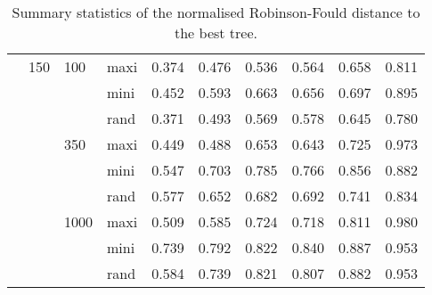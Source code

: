 \begin{table}[ht]
\begin{tabular}{llllrrrrrr}
   & 150 & 100 & maxi & 0.374 & 0.476 & 0.536 & 0.564 & 0.658 & 0.811 \\ 
   &  &  & mini & 0.452 & 0.593 & 0.663 & 0.656 & 0.697 & 0.895 \\ 
   &  &  & rand & 0.371 & 0.493 & 0.569 & 0.578 & 0.645 & 0.780 \\ 
   &  & 350 & maxi & 0.449 & 0.488 & 0.653 & 0.643 & 0.725 & 0.973 \\ 
   &  &  & mini & 0.547 & 0.703 & 0.785 & 0.766 & 0.856 & 0.882 \\ 
   &  &  & rand & 0.577 & 0.652 & 0.682 & 0.692 & 0.741 & 0.834 \\ 
   &  & 1000 & maxi & 0.509 & 0.585 & 0.724 & 0.718 & 0.811 & 0.980 \\ 
   &  &  & mini & 0.739 & 0.792 & 0.822 & 0.840 & 0.887 & 0.953 \\ 
   &  &  & rand & 0.584 & 0.739 & 0.821 & 0.807 & 0.882 & 0.953 \\ 
   \hline
\end{tabular}
\caption{Summary statistics of the normalised Robinson-Fould distance to the best tree.} 
\label{Tab_SummaryRFbest}
\end{table}
